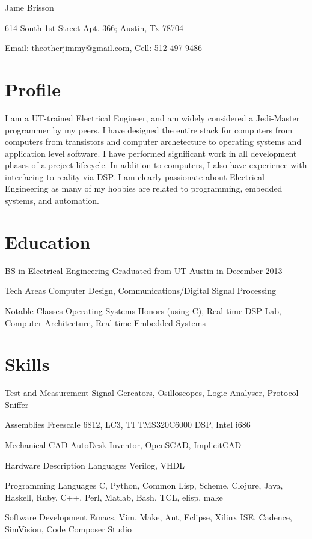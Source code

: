 \documentclass[a4paper,10pt]{article}
\begin{document}
Jame Brisson

614 South 1st Street Apt. 366; Austin, Tx 78704

Email: theotherjimmy@gmail.com, Cell: 512 497 9486

\section{Profile}
I am a UT-trained Electrical Engineer, and am widely considered a Jedi-Master programmer by my peers.
I have designed the entire stack for computers from computers from transistors and computer archetecture to operating systems and application level software. 
I have performed significant work in all development phases of a preject lifecycle.
In addition to computers, I also have experience with interfacing to reality via DSP.
I am clearly passionate about Electrical Engineering as many of my hobbies are related to programming, embedded systems, and automation.

\section{Education}
\begin{description}
  \item
    BS in Electrical Engineering
    Graduated from UT Austin in December 2013
  \item
    Tech Areas
    Computer Design, Communications/Digital Signal Processing
  \item
    Notable Classes
    Operating Systems Honors (using C), Real-time DSP Lab, Computer Architecture, Real-time Embedded Systems
\end{description}

\section{Skills}
\begin{description}
  \item
    Test and Measurement
    Signal Gereators, Osilloscopes, Logic Analyser, Protocol Sniffer
  \item
    Assemblies
    Freescale 6812, LC3, TI TMS320C6000 DSP, Intel i686
  \item
    Mechanical CAD
    AutoDesk Inventor, OpenSCAD, ImplicitCAD
  \item
    Hardware Description Languages
    Verilog, VHDL
  \item
    Programming Languages
    C, Python, Common Lisp, Scheme, Clojure, Java, Haskell, Ruby, C++, Perl, Matlab, Bash, TCL, elisp, make
  \item
    Software Development
    Emacs, Vim, Make, Ant, Eclipse, Xilinx ISE, Cadence, SimVision, Code Composer Studio
\end{description}
\end{document}
